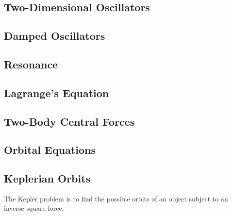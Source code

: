 \documentclass{article}
\begin{document}
\subsection{Two-Dimensional Oscillators}



\subsection{Damped Oscillators}



\subsection{Resonance}



\subsection{Lagrange's Equation}



\subsection{Two-Body Central Forces}



\subsection{Orbital Equations}



\subsection{Keplerian Orbits}
The Kepler problem is to find the possible orbits of an object subject to an inverse-square force.
\end{document}
